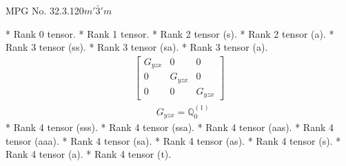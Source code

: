 \documentclass[fleqn,8pt,landscape]{jsarticle}
\begin{document}
\setcounter{MaxMatrixCols}{32}

\renewcommand{\tablename}{Table~}
\renewcommand{\figurename}{Figure~}
\begin{center}
\LARGE
MPG No. 32.3.120\quad$m'\bar{3}'m$
\end{center}
* Rank 0 tensor.
* Rank 1 tensor.
* Rank 2 tensor (s).
* Rank 2 tensor (a).
* Rank 3 tensor (ss).
* Rank 3 tensor (sa).
* Rank 3 tensor (a).
\begin{align*}
\begin{bmatrix} G_{yzx} & 0 & 0 \\ 0 & G_{yzx} & 0 \\ 0 & 0 & G_{yzx} \end{bmatrix}
\end{align*}
\begin{align*}
& G_{yzx} = \mathbb{Q}_{0}^{(1)}
\end{align*}
* Rank 4 tensor (sss).
* Rank 4 tensor (ssa).
* Rank 4 tensor (aas).
* Rank 4 tensor (aaa).
* Rank 4 tensor (sa).
* Rank 4 tensor (as).
* Rank 4 tensor (s).
* Rank 4 tensor (a).
* Rank 4 tensor (t).
\end{document}
